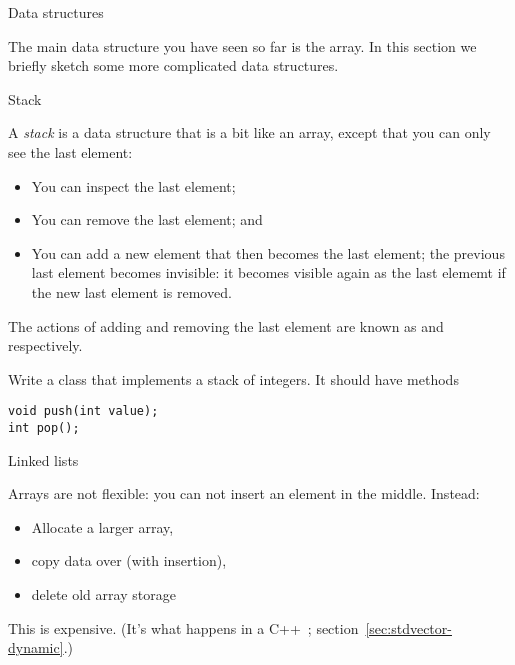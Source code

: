
 {Data structures}

The main data structure you have seen so far is the array. In this
section we briefly sketch some more complicated data structures.

 {Stack}

A \emph{stack} is a data structure that is a bit like an
array, except that you can only see the last element:
\begin{itemize}
\item You can inspect the last element;
\item You can remove the last element; and
\item You can add a new element that then becomes the last element;
  the previous last element becomes invisible: it becomes visible
  again as the last elememt if the new last element is removed.
\end{itemize}
The actions of adding and removing the last element are known as
 and  respectively.

\begin{exercise}
  Write a class that implements a stack of integers. It should have
  methods
\begin{verbatim}
void push(int value);
int pop();
\end{verbatim}
\end{exercise}


 {Linked lists}
\label{sec:linklist}

\prerequisite{\ref{ch:pointer}}

Arrays are not flexible: you can not insert an element in the
middle. Instead:
\begin{itemize}
\item Allocate a larger array,
\item copy data over (with insertion),
\item delete old array storage
\end{itemize}
This is expensive. (It's what happens in a
C++~; section~\ref{sec:stdvector-dynamic}.)

